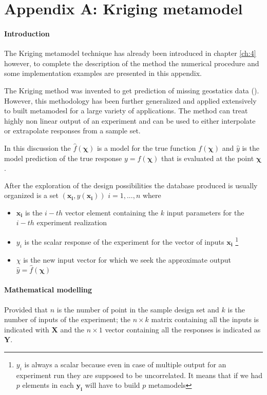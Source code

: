 \chapter*{Appendix A: Kriging metamodel}

\subsubsection{Introduction}
The Kriging metamodel technique has already been introduced in chapter \ref{ch:4} however, to complete the description of the method the numerical procedure and some implementation examples are presented in this appendix.

The Kriging method was invented to get prediction of missing geostatics data (\citet{krige1951statistical}). However, this methodology has been further generalized and applied extensively to built metamodesl for a large variety of applications.
The method can treat highly non linear output of an experiment and can be used to either interpolate or extrapolate responses from a sample set.

In this discussion the $\hat{f}(\boldsymbol{\chi})$ is a model for the true function $f(\boldsymbol{\chi})$ and $\hat{y}$ is the model prediction of the true response $y = f(\boldsymbol{\chi})$ that is evaluated at the point $\boldsymbol{\chi}$. 

After the exploration of the design possibilities the database produced is usually organized is a set $(\mathbf{x_i}, y(\mathbf{x_i}))$  $i=1,...,n$ where
\begin{itemize}
	\item $\mathbf{x_i}$ is the $i-th$ vector element containing the $k$ input parameters for the $i-th$ experiment realization
	\item $y_i$ is the scalar response of the experiment for the vector of inputs $\mathbf{x_i}$ \footnote{$y_i$ is always a scalar because even in case of multiple output for an experiment run they are supposed to be uncorrelated. It means that if we had $p$ elements in each $\mathbf{y_i}$ will have to build $p$ metamodels}
	\item $\chi$ is the new input vector for which we seek the approximate output $\hat{y}=\hat{f}(\boldsymbol{\chi})$
\end{itemize}

\subsubsection{Mathematical modelling}
Provided that $n$ is the number of point in the sample design set and $k$ is the number of inputs of the experiment; the $n \times k$ matrix containing all the inputs is indicated with $\mathbf{X}$ and the $n \times 1$ vector containing all the responses is indicated as $\mathbf{Y}$.

